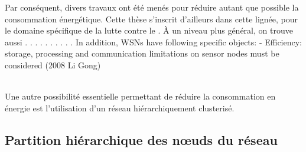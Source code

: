 Par conséquent, divers travaux ont été menés pour réduire autant que possible la consommation énergétique.
Cette thèse s'inscrit d'ailleurs dans cette lignée, pour le domaine spécifique de la lutte contre le \dds.
À un niveau plus général, on trouve aussi . . . . . . . . . .
In addition, WSNs have following specific objects:
- Efficiency: storage, processing and communication limitations on sensor nodes must be
considered
(2008 Li Gong)

\\

Une autre possibilité essentielle permettant de réduire la consommation en énergie est l'utilisation d'un réseau  hiérarchiquement clusterisé.

    \subsection{Partition hiérarchique des nœuds du réseau}%
    \label{st:subsec:partition}

